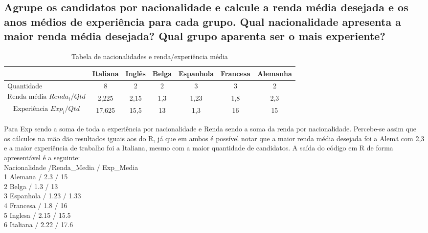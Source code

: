 \documentclass[12pt,a4paper]{article}
\begin{document}
\subsection{Agrupe os candidatos por nacionalidade e calcule a renda média desejada e os anos
 médios de experiência para cada grupo. Qual nacionalidade apresenta a maior renda
 média desejada? Qual grupo aparenta ser o mais experiente? }
\begin{table}[h]
    \centering
    \caption{Tabela de nacionalidades e renda/experiência média}
    \label{tab:placeholder_label}
    \begin{tabular}{lcccccc}
        \toprule
        & Italiana & Inglês & Belga & Espanhola & Francesa & Alemanha\\
        \midrule
        Quantidade & 8& 2& 2& 3& 3&2 \\
        \[\text{Renda média }Renda_i/Qtd\] &2,225 &2,15 & 1,3&1,23 &1,8 &2,3\\
        \[\text{Experiência }Exp_i/Qtd\] &17,625 &15,5 &13 &1,3 &16 &15 \\
        \bottomrule
    \end{tabular}
\end{table}
Para Exp sendo a soma de toda a experiência por nacionalidade e Renda sendo a soma da renda por nacionalidade. Percebe-se assim que os cálculos na mão dão resultados iguais aos do R, já que em ambos é possível notar que a maior renda média desejada foi a Alemã com 2,3 e a maior experiência de trabalho foi a Italiana, mesmo com a maior quantidade de candidatos.
A saída do código em R de forma apresentável é a seguinte:\\
Nacionalidade    /Renda_Media / Exp_Media\\
1 Alemana        /      2.3   /    15 \\  
2 Belga          /      1.3   /    13\\   
3 Espanhola      /      1.23  /   1.33\\
4 Francesa       /      1.8   /    16  \\ 
5 Inglesa        /      2.15  /    15.5 \\
6 Italiana       /      2.22  /    17.6 \\
\end{document}
